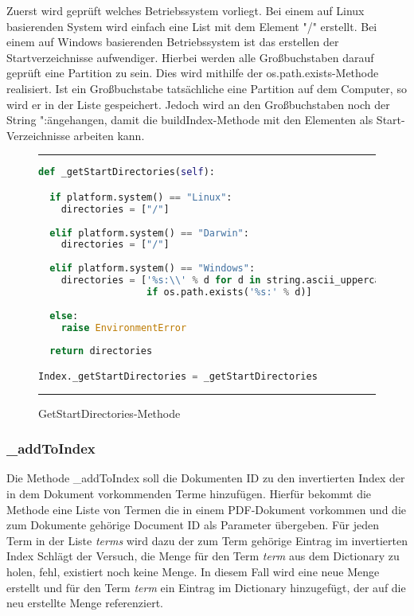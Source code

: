 Zuerst wird geprüft welches Betriebssystem vorliegt. Bei einem auf Linux basierenden System wird einfach eine List mit dem Element "/" erstellt. Bei einem auf Windows basierenden Betriebssystem ist das erstellen der Startverzeichnisse aufwendiger. Hierbei werden alle Großbuchstaben darauf geprüft eine Partition zu sein. Dies wird mithilfe der os.path.exists-Methode realisiert. Ist ein Großbuchstabe tatsächliche eine Partition auf dem Computer, so wird er in der Liste gespeichert. Jedoch wird an den Großbuchstaben noch der String ":\" angehangen, damit die buildIndex-Methode mit den Elementen als Start-Verzeichnisse arbeiten kann.

\begin{figure}[h]
	\rule{\textwidth}{0.4pt}
		\begin{lstlisting}[language=Python]
def _getStartDirectories(self):

  if platform.system() == "Linux":
    directories = ["/"]
    
  elif platform.system() == "Darwin":
    directories = ["/"]
     
  elif platform.system() == "Windows":
    directories = ['%s:\\' % d for d in string.ascii_uppercase
    			   if os.path.exists('%s:' % d)]
        
  else:
    raise EnvironmentError
        
  return directories

Index._getStartDirectories = _getStartDirectories
		\end{lstlisting}
	\rule{\textwidth}{0.4pt}
	\caption{GetStartDirectories-Methode}
	\label{fig:start}
\end{figure}

\subsubsection{\_addToIndex}\label{addtoindex}

Die Methode \_addToIndex soll die Dokumenten ID zu den invertierten Index der in dem Dokument vorkommenden Terme hinzufügen. Hierfür bekommt die Methode eine Liste von Termen die in einem PDF-Dokument vorkommen und die zum Dokumente gehörige Document ID als Parameter übergeben. Für jeden Term in der Liste \emph{terms} wird dazu der zum Term gehörige Eintrag im invertierten Index 
Schlägt der Versuch, die Menge für den Term \emph{term} aus dem Dictionary zu holen, fehl, existiert noch keine Menge. In diesem Fall wird eine neue Menge erstellt und für den Term \emph{term} ein Eintrag im Dictionary hinzugefügt, der auf die neu erstellte Menge referenziert.

